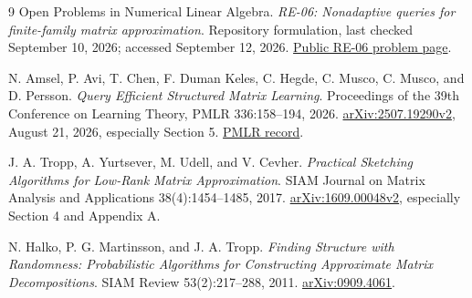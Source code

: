 \documentclass[11pt]{article}
\numberwithin{equation}{section}
\theoremstyle{remark}
\begin{document}
\begin{thebibliography}{9}
Open Problems in Numerical Linear Algebra.
\emph{RE-06: Nonadaptive queries for finite-family matrix approximation}.
Repository formulation, last checked September 10, 2026; accessed September 12, 2026.
\href{https://github.com/ajt60gaibb/OpenProblemsInNLA/tree/main/randomized-and-low-rank-approximation/RE-06}{Public RE-06 problem page}.

N. Amsel, P. Avi, T. Chen, F. Duman Keles, C. Hegde, C. Musco, C. Musco, and D. Persson.
\emph{Query Efficient Structured Matrix Learning}.
Proceedings of the 39th Conference on Learning Theory, PMLR 336:158--194, 2026.
\href{https://arxiv.org/html/2507.19290v2}{arXiv:2507.19290v2}, August 21, 2026, especially Section 5.
\href{https://proceedings.mlr.press/v336/amsel26a.html}{PMLR record}.

J. A. Tropp, A. Yurtsever, M. Udell, and V. Cevher.
\emph{Practical Sketching Algorithms for Low-Rank Matrix Approximation}.
SIAM Journal on Matrix Analysis and Applications 38(4):1454--1485, 2017.
\href{https://arxiv.org/html/1609.00048v2}{arXiv:1609.00048v2}, especially Section 4 and Appendix A.

N. Halko, P. G. Martinsson, and J. A. Tropp.
\emph{Finding Structure with Randomness: Probabilistic Algorithms for Constructing Approximate Matrix Decompositions}.
SIAM Review 53(2):217--288, 2011.
\href{https://arxiv.org/abs/0909.4061}{arXiv:0909.4061}.
\end{thebibliography}
\end{document}
